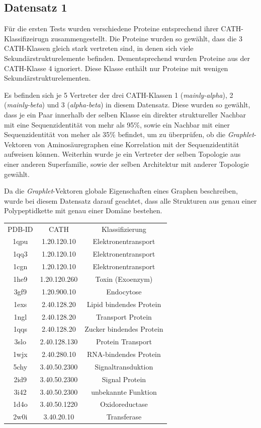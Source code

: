 \documentclass{report}
\begin{document}
\subsection{Datensatz 1} 

F\"ur die ersten Tests wurden verschiedene Proteine entsprechend ihrer CATH-Klassifizeirugn zusammengestellt. Die Proteine wurden so gew\"ahlt, dass die 3 CATH-Klassen gleich stark vertreten sind, in denen sich viele Sekund\"arstrukturelemente befinden. Dementsprechend wurden Proteine aus der CATH-Klasse 4 ignoriert. Diese Klasse enth\"alt nur Proteine mit wenigen Sekund\"arstrukturelementen.

Es befinden sich je 5 Vertreter der drei CATH-Klassen 1 (\textit{mainly-alpha}), 2 (\textit{mainly-beta}) und 3 (\textit{alpha-beta}) in diesem Datensatz. Diese wurden so gew\"ahlt, dass je ein Paar innerhalb der selben Klasse ein direkter struktureller Nachbar mit eine Sequenzidentit\"at von mehr als 95\%, sowie ein Nachbar mit einer Sequenzidentit\"at von meher als 35\% befindet, um zu \"uberpr\"ufen, ob die \textit{Graphlet}-Vektoren von Aminos\"auregraphen eine Korrelation mit der Sequenzidentit\"at aufweisen k\"onnen.
Weiterhin wurde je ein Vertreter der selben Topologie aus einer anderen Superfamilie, sowie der selben Architektur mit anderer Topologie gew\"ahlt.
 
Da die \textit{Graphlet}-Vektoren globale Eigenschaften eines Graphen beschreiben, wurde bei diesem Datensatz darauf geachtet, dass alle Strukturen aus genau einer Polypeptidkette mit genau einer Dom\"ane bestehen.


\begin{tabular}{c c c}

PDB-ID & CATH        & Klassifizierung         \\
1qpu   & 1.20.120.10 & Elektronentransport     \\
1qq3   & 1.20.120.10 & Elektronentransport     \\
1cgn   & 1.20.120.10 & Elektronentransport     \\
1he9   & 1.20.120.260& Toxin (Exoenzym)        \\
3gf9   & 1.20.900.10 & Endocytose              \\
1exs   & 2.40.128.20 & Lipid bindendes Protein \\
1ngl   & 2.40.128.20 & Transport Protein       \\
1qqs   & 2.40.128.20 & Zucker bindendes Protein\\
3slo   & 2.40.128.130& Protein Transport       \\
1wjx   & 2.40.280.10 & RNA-bindendes Protein   \\
5chy   & 3.40.50.2300& Signaltransduktion      \\
2id9   & 3.40.50.2300& Signal Protein          \\
3i42   & 3.40.50.2300& unbekannte Funktion     \\
1d4o   & 3.40.50.1220& Oxidoreductase          \\
2w0i   & 3.40.20.10  & Transferase             \\

\end{tabular}
\end{document}

